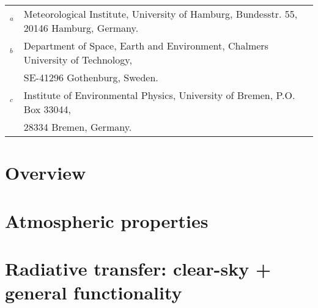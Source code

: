 \documentclass[11pt,twoside,a4paper,fleqn]{book}
\begin{document}
\begin{tabular}[c]{ll}
$^a$&Meteorological Institute, University of Hamburg, Bundesstr. 55,
20146 Hamburg, Germany.\\
$^b$&Department of Space, Earth and Environment, Chalmers University of Technology,
\\&SE-41296 Gothenburg, Sweden. \\
$^c$&Institute of Environmental Physics, University of Bremen, P.O. Box 33044, 
\\&28334 Bremen, Germany.\\
\end{tabular}


%
\newpage
\thispagestyle{empty}
\rule{0pt}{10pt}
\newpage

\tableofcontents

\cleardoublepage
{}
     


\part{Overview}







\part{Atmospheric properties}





\part{Radiative transfer: clear-sky + 
      general functionality}









\end{document}

